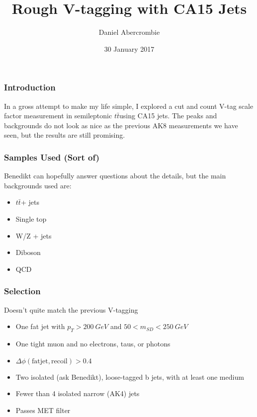 \documentclass{beamer}
\author[D. Abercrombie]{
  Daniel Abercrombie
}
\title{\bf \sffamily Rough V-tagging with CA15 Jets}
\date{30 January 2017}
\newcommand{\tt}{\ensuremath{t\bar{t}}}
\begin{document}
\begin{frame}[nonumbering]
  \titlepage
\end{frame}

\begin{frame}
  \frametitle{Introduction}

  In a gross attempt to make my life simple, I explored a cut and count V-tag scale factor measurement
  in semileptonic \tt using CA15 jets.
  The peaks and backgrounds do not look as nice as the previous AK8 measurements we have seen,
  but the results are still promising.

\end{frame}

\begin{frame}
  \frametitle{Samples Used (Sort of)}

  Benedikt can hopefully answer questions about the details, but the main backgrounds used are:

  \begin{itemize}
  \item \tt + jets
  \item Single top
  \item W/Z + jets
  \item Diboson
  \item QCD
  \end{itemize}

\end{frame}

\begin{frame}
  \frametitle{Selection}

  Doesn't quite match the previous V-tagging

  \begin{itemize}
  \item One fat jet with $p_T > \SI{200}{GeV}$ and $50 < m_{SD} < \SI{250}{GeV}$
  \item One tight muon and no electrons, taus, or photons
  \item $\Delta\phi\mathrm{(fat jet, recoil)} > 0.4$
  \item Two isolated (ask Benedikt), loose-tagged b jets, with at least one medium
  \item Fewer than 4 isolated narrow (AK4) jets
  \item Passes MET filter
  \end{itemize}

\end{frame}
\end{document}
